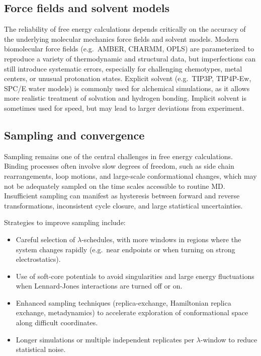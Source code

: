\documentclass[12pt]{article}
\begin{document}
\subsection{Force fields and solvent models}

The reliability of free energy calculations depends critically on the accuracy of the underlying molecular mechanics force fields and solvent models. 
Modern biomolecular force fields (e.g.\ AMBER, CHARMM, OPLS) are parameterized to reproduce a variety of thermodynamic and structural data, but imperfections can still introduce systematic errors, especially for challenging chemotypes, metal centers, or unusual protonation states.\cite{CH10_wang2004amber} 
Explicit solvent (e.g.\ TIP3P, TIP4P-Ew, SPC/E water models) is commonly used for alchemical simulations, as it allows more realistic treatment of solvation and hydrogen bonding. 
Implicit solvent is sometimes used for speed, but may lead to larger deviations from experiment. 

\subsection{Sampling and convergence}

Sampling remains one of the central challenges in free energy calculations. 
Binding processes often involve slow degrees of freedom, such as side chain rearrangements, loop motions, and large-scale conformational changes, which may not be adequately sampled on the time scales accessible to routine MD. 
Insufficient sampling can manifest as hysteresis between forward and reverse transformations, inconsistent cycle closure, and large statistical uncertainties.\cite{CH10_aldeghi2018accurate} 

Strategies to improve sampling include:
\begin{itemize}
  \item Careful selection of \(\lambda\)-schedules, with more windows in regions where the system changes rapidly (e.g.\ near endpoints or when turning on strong electrostatics).
  \item Use of soft-core potentials to avoid singularities and large energy fluctuations when Lennard-Jones interactions are turned off or on.
  \item Enhanced sampling techniques (replica-exchange, Hamiltonian replica exchange, metadynamics) to accelerate exploration of conformational space along difficult coordinates.
  \item Longer simulations or multiple independent replicates per \(\lambda\)-window to reduce statistical noise.
\end{itemize}
\end{document}
